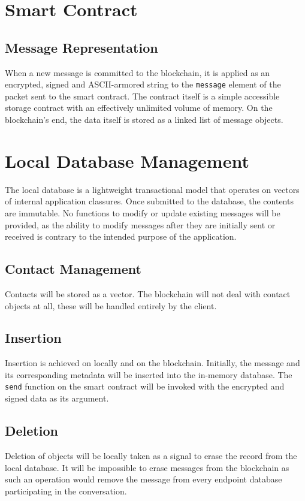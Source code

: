 \documentclass[]{article}
\begin{document}
\section{Smart Contract}
\subsection{Message Representation}
When a new message is committed to the blockchain, it is applied as an encrypted, signed and ASCII-armored string to the \verb!message! element of the packet sent to the smart contract. The contract itself is a simple accessible storage contract with an effectively unlimited volume of memory. On the blockchain's end, the data itself is stored as a linked list of message objects.

\section{Local Database Management}
The local database is a lightweight transactional model that operates on vectors of internal application classures. Once submitted to the database, the contents are immutable. No functions to modify or update existing messages will be provided, as the ability to modify messages after they are initially sent or received is contrary to the intended purpose of the application.
\subsection{Contact Management}
Contacts will be stored as a vector. The blockchain will not deal with contact objects at all, these will be handled entirely by the client.
\subsection{Insertion}
Insertion is achieved on locally and on the blockchain. Initially, the message and its corresponding metadata will be inserted into the in-memory database. The \verb!send! function on the smart contract will be invoked with the encrypted and signed data as its argument. 
\subsection{Deletion}
Deletion of objects will be locally taken as a signal to erase the record from the local database. It will be impossible to erase messages from the blockchain as such an operation would remove the message from every endpoint database participating in the conversation.
\end{document}
